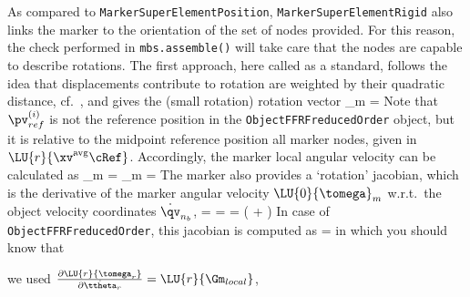     As compared to \texttt{MarkerSuperElementPosition}, \texttt{MarkerSuperElementRigid} also links the marker to the orientation of 
    the set of nodes provided. For this reason, the check performed in \texttt{mbs.assemble()} will take care that the nodes are capable
    to describe rotations.
    The first approach, here called as a standard, follows the idea that displacements contribute to rotation are weighted by their quadratic distance, 
    cf.\ \cite{HeirmanDesmet2010}, and gives the (small rotation) rotation vector
    \be
       _{m} = 
    \ee
    Note that $\pv_{ref}^{(i)}$ is not the reference position in the \texttt{ObjectFFRFreducedOrder} object, but it is relative to the midpoint reference position
    all marker nodes, given in $\LU{r}{\xv^\mathrm{avg}\cRef}$.
    Accordingly, the marker local angular velocity can be calculated as
    \be
       _{m} = _{m} = 
    \ee
    The marker also provides a `rotation' jacobian, which is the derivative of the marker angular velocity $\LU{0}{\tomega}_{m}$ w.r.t.\ the 
    object velocity coordinates $\dot \qv_{n_b}$,
    \be
       = 
                  = 
                  =  \left( + 
                                    \right)
    \ee
    In case of \texttt{ObjectFFRFreducedOrder}, this jacobian is computed as
    \be \label{eq:MarkerSuperElementRigid:jacRotStandard}
       = 
    \ee
    in which you should know that
    \bi
      \item we used $\frac{\partial \LU{r}{\tomega_{r}} }{\partial \dot \ttheta_r} = \LU{r}{\Gm_{local}}$, 
